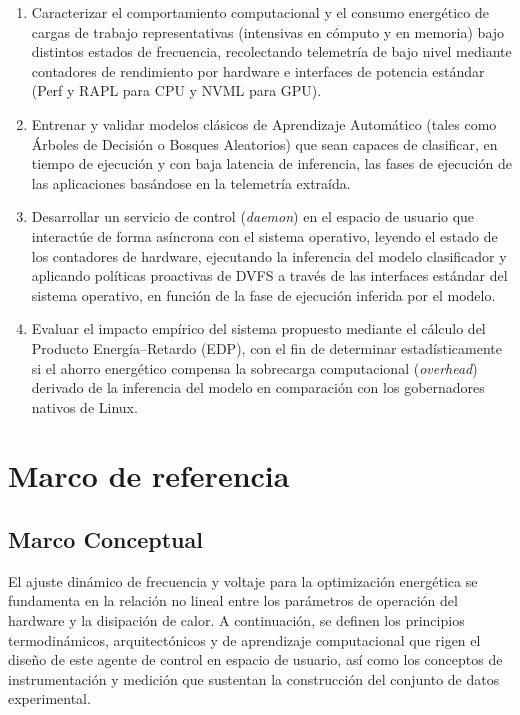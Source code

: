 \documentclass[12pt,oneside,spanish]{book}
\begin{document}
\begin{enumerate}

    \item Caracterizar el comportamiento computacional y el consumo energético de cargas de trabajo representativas (intensivas en cómputo y en memoria) bajo distintos estados de frecuencia, recolectando telemetría de bajo nivel mediante contadores de rendimiento por hardware e interfaces de potencia estándar (Perf y RAPL para CPU y NVML para GPU).

    \item Entrenar y validar modelos clásicos de Aprendizaje Automático (tales como Árboles de Decisión o Bosques Aleatorios) que sean capaces de clasificar, en tiempo de ejecución y con baja latencia de inferencia, las fases de ejecución de las aplicaciones basándose en la telemetría extraída.

    \item Desarrollar un servicio de control (\textit{daemon}) en el espacio de usuario que interactúe de forma asíncrona con el sistema operativo, leyendo el estado de los contadores de hardware, ejecutando la inferencia del modelo clasificador y aplicando políticas proactivas de DVFS a través de las interfaces estándar del sistema operativo, en función de la fase de ejecución inferida por el modelo.

    \item Evaluar el impacto empírico del sistema propuesto mediante el cálculo del Producto Energía--Retardo (EDP), con el fin de determinar estadísticamente si el ahorro energético compensa la sobrecarga computacional (\textit{overhead}) derivado de la inferencia del modelo en comparación con los gobernadores nativos de Linux.

\end{enumerate}


\chapter{Marco de referencia}

\section{Marco Conceptual}

El ajuste dinámico de frecuencia y voltaje para la optimización energética se fundamenta en la relación no lineal entre los parámetros de operación del hardware y la disipación de calor. A continuación, se definen los principios termodinámicos, arquitectónicos y de aprendizaje computacional que rigen el diseño de este agente de control en espacio de usuario, así como los conceptos de instrumentación y medición que sustentan la construcción del conjunto de datos experimental.
\end{document}
